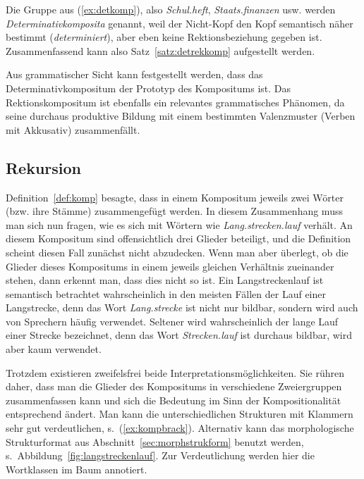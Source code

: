 Die Gruppe aus (\ref{ex:detkomp}), also \textit{Schul.heft}, \textit{Staats.finanzen} usw. werden \textit{Determinativkomposita} genannt, weil der Nicht-Kopf den Kopf semantisch näher bestimmt (\textit{determiniert}), aber eben keine Rektionsbeziehung gegeben ist.
Zusammenfassend kann also Satz~\ref{satz:detrekkomp} aufgestellt werden.


Aus grammatischer Sicht kann festgestellt werden, dass das Determinativkompositum der Prototyp des Kompositums ist.
Das Rektionskompositum ist ebenfalls ein relevantes grammatisches Phänomen, da seine durchaus produktive Bildung mit einem bestimmten Valenzmuster (Verben mit Akkusativ) zusammenfällt.

\subsection{Rekursion}

\label{sec:rekursion}


Definition~\ref{def:komp} besagte, dass in einem Kompositum jeweils zwei Wörter (bzw. ihre Stämme) zusammengefügt werden.
In diesem Zusammenhang muss man sich nun fragen, wie es sich mit Wörtern wie \textit{Lang.strecken.lauf} verhält.
An diesem Kompositum sind offensichtlich drei Glieder beteiligt, und die Definition scheint diesen Fall zunächst nicht abzudecken.
Wenn man aber überlegt, ob die Glieder dieses Kompositums in einem jeweils gleichen Verhältnis zueinander stehen, dann erkennt man, dass dies nicht so ist.
Ein Langstreckenlauf ist semantisch betrachtet wahrscheinlich in den meisten Fällen der Lauf einer Langstrecke, denn das Wort \textit{Lang.strecke} ist nicht nur bildbar, sondern wird auch von Sprechern häufig verwendet.
Seltener wird wahrscheinlich der lange Lauf einer Strecke bezeichnet, denn das Wort \textit{Strecken.lauf} ist durchaus bildbar, wird aber kaum verwendet.

Trotzdem existieren zweifelsfrei beide Interpretationsmöglichkeiten.
Sie rühren daher, dass man die Glieder des Kompositums in verschiedene Zweiergruppen zusammenfassen kann und sich die Bedeutung im Sinn der Kompositionalität entsprechend ändert.
Man kann die unterschiedlichen Strukturen mit Klammern sehr gut verdeutlichen, s.\ (\ref{ex:kompbrack}).
Alternativ kann das morphologische Strukturformat aus Abschnitt~\ref{sec:morphstrukform} benutzt werden, s.\ Abbildung~\ref{fig:langstreckenlauf}.
Zur Verdeutlichung werden hier die Wortklassen im Baum annotiert.

